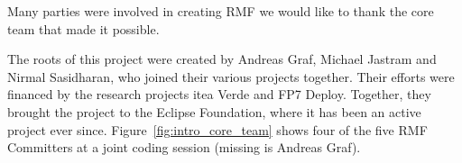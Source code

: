 Many parties were involved in creating RMF we would like to thank the core team that made it possible.

The roots of this project were created by Andreas Graf, Michael Jastram and Nirmal Sasidharan, who joined their various projects together.  Their efforts were financed by the research projects itea Verde and FP7 Deploy.  Together, they brought the project to the Eclipse Foundation, where it has been an active project ever since.  Figure~\ref{fig:intro_core_team} shows four of the five RMF Committers at a joint coding session (missing is Andreas Graf).



